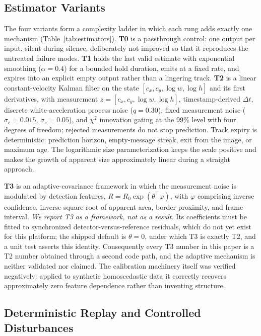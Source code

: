 \subsection{Estimator Variants}

The four variants form a complexity ladder in which each rung adds exactly
one mechanism (Table~\ref{tab:estimators}). \textbf{T0} is a passthrough
control: one output per input, silent during silence, deliberately not
improved so that it reproduces the untreated failure modes. \textbf{T1} holds
the last valid estimate with exponential smoothing ($\alpha = 0.4$) for a
bounded hold duration, emits at a fixed rate, and expires into an explicit
empty output rather than a lingering track. \textbf{T2} is a linear
constant-velocity Kalman filter on the state $[c_x, c_y, \log w, \log h]$ and
its first derivatives, with measurement $z = [c_x, c_y, \log w, \log h]$,
timestamp-derived $\Delta t$, discrete white-acceleration process noise
($q = 0.30$), fixed measurement noise ($\sigma_c = 0.015$, $\sigma_s =
0.05$), and $\chi^2$ innovation gating at the 99\% level with four degrees of
freedom; rejected measurements do not stop prediction. Track expiry is
deterministic: prediction horizon, empty-message streak, exit from the image,
or maximum age. The logarithmic size parameterization keeps the scale
positive and makes the growth of apparent size approximately linear during a
straight approach.

\textbf{T3} is an adaptive-covariance framework in which the measurement
noise is modulated by detection features, $R = R_0 \exp(\theta^\top
\varphi)$, with $\varphi$ comprising inverse confidence, inverse square root
of apparent area, border proximity, and frame interval. \emph{We report T3 as
a framework, not as a result.} Its coefficients must be fitted to
synchronized detector-versus-reference residuals, which do not yet exist for
this platform; the shipped default is $\theta = 0$, under which T3 is exactly
T2, and a unit test asserts this identity. Consequently every T3 number in
this paper is a T2 number obtained through a second code path, and the
adaptive mechanism is neither validated nor claimed. The calibration
machinery itself was verified negatively: applied to synthetic homoscedastic
data it correctly recovers approximately zero feature dependence rather than
inventing structure.



\subsection{Deterministic Replay and Controlled Disturbances}

